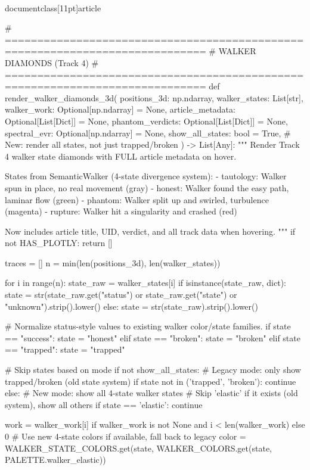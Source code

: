 \\documentclass[11pt]{article}
\begin{document}
\begin{CodeBlock}
{{# =============================================================================
# WALKER DIAMONDS (Track 4)
# =============================================================================
def render_walker_diamonds_3d(
    positions_3d: np.ndarray,
    walker_states: List[str],
    walker_work: Optional[np.ndarray] = None,
    article_metadata: Optional[List[Dict]] = None,
    phantom_verdicts: Optional[List[Dict]] = None,
    spectral_evr: Optional[np.ndarray] = None,
    show_all_states: bool = True,  # New: render all states, not just trapped/broken
) -> List[Any]:
    """
    Render Track 4 walker state diamonds with FULL article metadata on hover.

    States from SemanticWalker (4-state divergence system):
    - tautology: Walker spun in place, no real movement (gray)
    - honest: Walker found the easy path, laminar flow (green)
    - phantom: Walker split up and swirled, turbulence (magenta)
    - rupture: Walker hit a singularity and crashed (red)

    Now includes article title, UID, verdict, and all track data when hovering.
    """
    if not HAS_PLOTLY:
        return []

    traces = []
    n = min(len(positions_3d), len(walker_states))

    for i in range(n):
        state_raw = walker_states[i]
        if isinstance(state_raw, dict):
            state = str(state_raw.get("status") or state_raw.get("state") or "unknown").strip().lower()
        else:
            state = str(state_raw).strip().lower()

        # Normalize status-style values to existing walker color/state families.
        if state == "success":
            state = "honest"
        elif state == "broken":
            state = "broken"
        elif state == "trapped":
            state = "trapped"

        # Skip states based on mode
        if not show_all_states:
            # Legacy mode: only show trapped/broken (old state system)
            if state not in ('trapped', 'broken'):
                continue
        else:
            # New mode: show all 4-state walker states
            # Skip 'elastic' if it exists (old system), show all others
            if state == 'elastic':
                continue

        work = walker_work[i] if walker_work is not None and i < len(walker_work) else 0
        # Use new 4-state colors if available, fall back to legacy
        color = WALKER_STATE_COLORS.get(state, WALKER_COLORS.get(state, PALETTE.walker_elastic))

}}
\end{CodeBlock}
\end{document}
